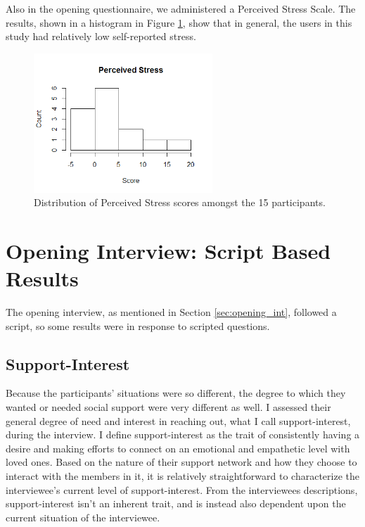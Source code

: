   Also in the opening questionnaire, we administered a Perceived Stress Scale.
  The results, shown in a histogram in Figure \ref{fig:perceived_stress},
  show that in general, the users in this study had relatively low
  self-reported stress.

    \begin{figure}
    \centering
    \includegraphics[width=0.6\textwidth]{perceived_stress.png}
    \caption[Perceived Stress]{
      Distribution of Perceived Stress scores amongst the 15 participants.
    }
    \label{fig:perceived_stress}
    \end{figure}

\section{Opening Interview: Script Based Results}
  The opening interview, as mentioned in Section \ref{sec:opening_int},
  followed a script, so some results were in response to scripted questions.

  \subsection{Support-Interest}
  Because the participants' situations were so different,
  the degree to which they wanted or needed social support were very different as well.
  I assessed their general degree of need and interest in reaching out,
  what I call support-interest, during the interview.
  I define support-interest as the trait of consistently having a desire
  and making efforts to
  connect on an emotional and empathetic level with loved ones.
  Based on the nature of their support network
  and how they choose to interact with the members in it,
  it is relatively straightforward to characterize the interviewee's
  current level of support-interest.
  From the interviewees descriptions, support-interest isn't an inherent trait,
  and is instead also dependent upon the current situation of the interviewee.


